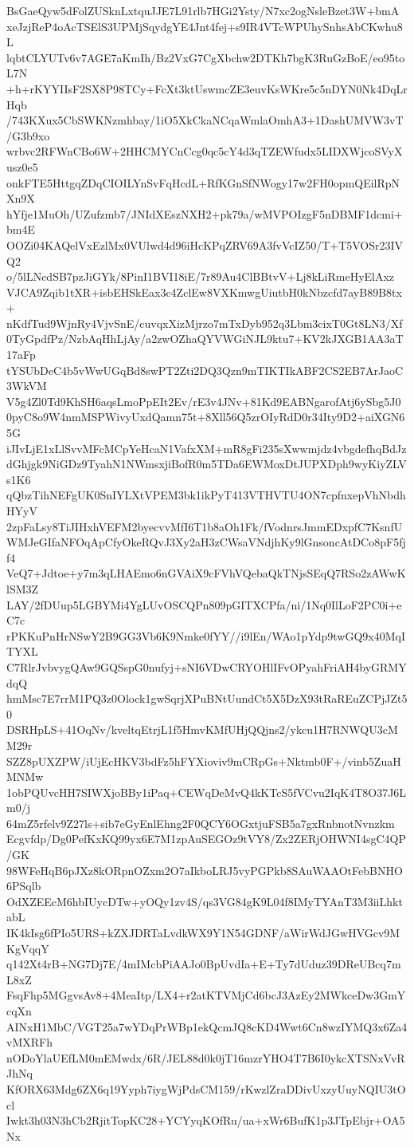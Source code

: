 BsGaeQyw5dFolZUSknLxtquJJE7L91rlb7HGi2Ysty/N7xc2ogNsleBzet3W+bmA
xeJzjReP4oAcTSElS3UPMjSqydgYE4Jnt4fej+s9IR4VTcWPUhySnhsAbCKwhu8L
lqbtCLYUTv6v7AGE7aKmIh/Bz2VxG7CgXbchw2DTKh7bgK3RuGzBoE/eo95toL7N
+h+rKYYIIsF2SX8P98TCy+FcXt3ktUswmcZE3euvKsWKre5c5nDYN0Nk4DqLrHqb
/743KXux5CbSWKNzmhbay/1iO5XkCkaNCqaWmlaOmhA3+1DashUMVW3vT/G3b9xo
wrbvc2RFWnCBo6W+2HHCMYCnCcg0qc5cY4d3qTZEWfudx5LIDXWjcoSVyXusz0e5
onkFTE5HttgqZDqCIOILYnSvFqHcdL+RfKGnSfNWogy17w2FH0opmQEilRpNXn9X
hYfje1MuOh/UZufzmb7/JNIdXEszNXH2+pk79a/wMVPOIzgF5nDBMF1dcmi+bm4E
OOZi04KAQelVxEzlMx0VUlwd4d96iHcKPqZRV69A3fvVcIZ50/T+T5VOSr23IVQ2
o/5lLNcdSB7pzJiGYk/8PinI1BVI18iE/7r89Au4ClBBtvV+Lj8kLiRmeHyElAxz
VJCA9Zqib1tXR+isbEHSkEax3c4ZclEw8VXKmwgUiutbH0kNbzcfd7ayB89B8tx+
nKdfTud9WjnRy4VjvSnE/cuvqxXizMjrzo7mTxDyb952q3Lbm3cixT0Gt8LN3/Xf
0TyGpdfPz/NzbAqHhLjAy/a2zwOZhaQYVWGiNJL9ktu7+KV2kJXGB1AA3aT17aFp
tYSUbDeC4b5vWwUGqBd8swPT2Zti2DQ3Qzn9mTIKTIkABF2CS2EB7ArJaoC3WkVM
V5g4Zl0Td9KhSH6aqsLmoPpEIt2Ev/rE3v4JNv+81Kd9EABNgarofAtj6ySbg5J0
0pyC8o9W4nmMSPWivyUxdQamn75t+8Xll56Q5zrOIyRdD0r34Ity9D2+aiXGN65G
iJIvLjE1xLlSvvMFcMCpYeHcaN1VafxXM+mR8gFi235sXwwmjdz4vbgdefhqBdJz
dGhjgk9NiGDz9TyahN1NWmsxjiBofR0m5TDa6EWMoxDtJUPXDph9wyKiyZLVs1K6
qQbzTihNEFgUK0SnIYLXtVPEM3bk1ikPyT413VTHVTU4ON7cpfnxepVhNbdhHYyV
2zpFaLsy8TiJIHxhVEFM2byecvvMfI6T1b8aOh1Fk/fVodnrsJmmEDxpfC7KsnfU
WMJeGIfaNFOqApCfyOkeRQvJ3Xy2aH3zCWsaVNdjhKy9lGnsoncAtDCo8pF5fjf4
VeQ7+Jdtoe+y7m3qLHAEmo6nGVAiX9cFVhVQebaQkTNjsSEqQ7RSo2zAWwKlSM3Z
LAY/2fDUup5LGBYMi4YgLUvOSCQPn809pGITXCPfa/ni/1Nq0IlLoF2PC0i+eC7c
rPKKuPnHrNSwY2B9GG3Vb6K9Nmke0fYY//i9lEn/WAo1pYdp9twGQ9x40MqITYXL
C7RlrJvbvygQAw9GQSspG0nufyj+sNI6VDwCRYOHlIFvOPyahFriAH4byGRMYdqQ
hmMsc7E7rrM1PQ3z0Olock1gwSqrjXPuBNtUundCt5X5DzX93tRaREuZCPjJZt50
DSRHpLS+41OqNv/kveltqEtrjL1f5HmvKMfUHjQQjns2/ykcu1H7RNWQU3cMM29r
SZZ8pUXZPW/iUjEcHKV3bdFz5hFYXioviv9mCRpGs+Nktmb0F+/vinb5ZuaHMNMw
1obPQUvcHH7SIWXjoBBy1iPaq+CEWqDeMvQ4kKTcS5fVCvu2IqK4T8O37J6Lm0/j
64mZ5rfelv9Z27ls+sib7eGyEnlEhng2F0QCY6OGxtjuFSB5a7gxRnbnotNvnzkm
Ecgvfdp/Dg0PefKxKQ99yx6E7M1zpAuSEGOz9tVY8/Zx2ZERjOHWNI4sgC4QP/GK
98WFeHqB6pJXz8kORpnOZxm2O7aIkboLRJ5vyPGPkb8SAuWAAOtFebBNHO6PSqlb
OdXZEEcM6hbIUycDTw+yOQy1zv4S/qs3VG84gK9L04f8IMyTYAnT3M3iiLhktabL
IK4kIsg6fPIo5URS+kZXJDRTaLvdkWX9Y1N54GDNF/aWirWdJGwHVGcv9MKgVqqY
q142Xt4rB+NG7Dj7E/4mIMcbPiAAJo0BpUvdIa+E+Ty7dUduz39DReUBcq7mL8xZ
FsqFhp5MGgvsAv8+4MeaItp/LX4+r2atKTVMjCd6bcJ3AzEy2MWkceDw3GmYcqXn
AINxH1MbC/VGT25a7wYDqPrWBp1ekQcmJQ8cKD4Wwt6Cn8wzIYMQ3x6Za4vMXRFh
nODoYlaUEfLM0mEMwdx/6R/JEL88d0k0jT16mzrYHO4T7B6I0ykcXTSNxVvRJhNq
KfORX63Mdg6ZX6q19Yyph7iygWjPdsCM159/rKwzlZraDDivUxzyUuyNQIU3tOcl
Iwkt3h03N3hCb2RjitTopKC28+YCYyqKOfRu/ua+xWr6BufK1p3JTpEbjr+OA5Nx
